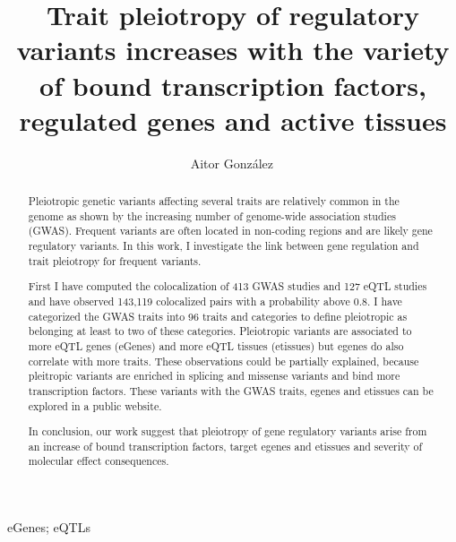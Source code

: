 
\title{Trait pleiotropy of regulatory variants increases with the variety of bound transcription factors, regulated genes and active tissues}

\author[1,*]{Aitor González\,}

\date{}

\maketitle

\begin{abstract}

Pleiotropic genetic variants affecting several traits are relatively common in the genome as shown by the increasing number of genome-wide association studies (GWAS).
%
Frequent variants are often located in non-coding regions and are likely gene regulatory variants.
%
In this work, I investigate the link between gene regulation and trait pleiotropy for frequent variants.

First I have computed the colocalization of 413 GWAS studies and 127 eQTL studies and have observed 143,119 colocalized pairs with a probability above 0.8.
%
I have categorized the GWAS traits into 96 traits and categories to define pleiotropic as belonging at least to two of these categories.
%
Pleiotropic variants are associated to more eQTL genes (eGenes) and more eQTL tissues (etissues) but egenes do also correlate with more traits.
%
These observations could be partially explained, because pleitropic variants are enriched in splicing and missense variants and bind more transcription factors.
%
These variants with the GWAS traits, egenes and etissues can be explored in a public website.

In conclusion, our work suggest that pleiotropy of gene regulatory variants arise from an increase of bound transcription factors, target egenes and etissues and severity of molecular effect consequences.

\end{abstract}

\begin{keywords2}
eGenes; eQTLs
\end{keywords2}

